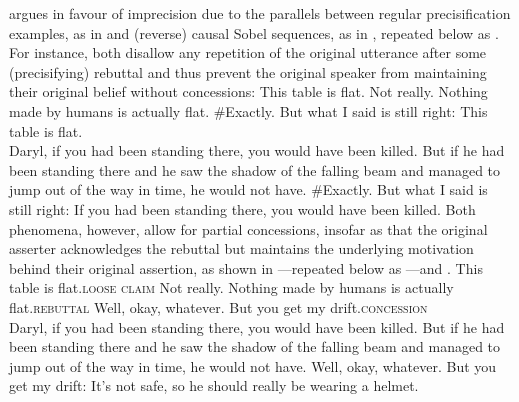 \textcite{Klecha2014} argues in favour of imprecision due to the parallels between regular precisification examples, as in  and (reverse) causal Sobel sequences, as in , repeated below as . For instance, both disallow any repetition of the original utterance after some (precisifying) rebuttal and thus prevent the original speaker from maintaining their original belief without concessions:%
\pex{}\vspace{-2mm}
\a{}This table is flat.
\a{}Not really. Nothing made by humans is actually flat.
\a{}\#Exactly. But what I said is still right: This table is flat.\\
\emptyfill\parencite[adapted from][p. 113]{Klecha2014}
\xe
\pex{}
			\a	{}Daryl, if you had been standing there, you would have been killed.
			\a	{}But if he had been standing there and he saw the shadow of the falling beam and managed to jump out of the way in time, he would not have.
			\a	{}\#Exactly. But what I said is still right:  If you had been
standing there, you would have been killed.\hfill\parencite[adapted from][p. 153f]{Klecha2014}
\xe
Both phenomena, however, allow for partial concessions, insofar as that the original asserter acknowledges the rebuttal but maintains the underlying motivation behind their original assertion, as shown in ---repeated below as ---and .
\pex{}
\a{}This table is flat.\hfill{\scshape loose claim}
\a{}Not really. Nothing made by humans is actually flat.\hfill{\scshape rebuttal}
\a{}Well, okay, whatever. But you get my drift.\hfill{\scshape concession}\\
\emptyfill\parencite[p. 113]{Klecha2014}
\xe
\pex{}
			\a	{}Daryl, if you had been standing there, you would have been killed.
			\a	{}But if he had been standing there and he saw the shadow of the falling beam and managed to jump out of the way in time, he would not have.
			\a	{}Well, okay, whatever. But you get my drift: It's not safe, so he should really be wearing a helmet.
\xe


